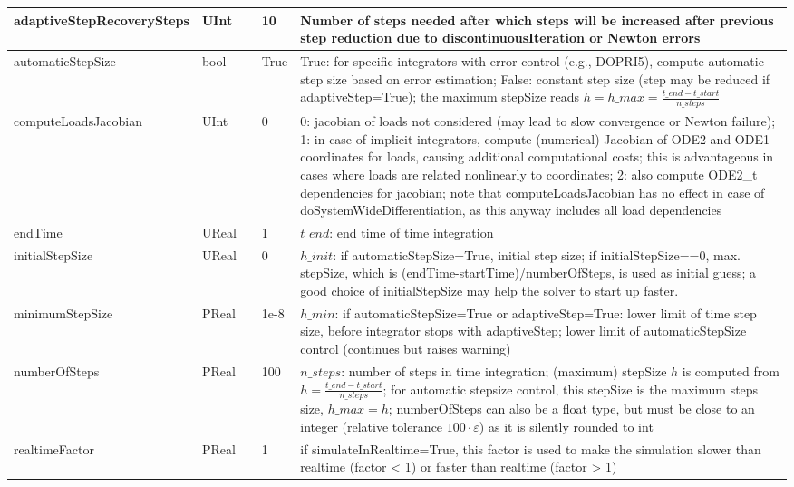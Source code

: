 \begin{center}
\begin{longtable}{| p{4.2cm} | p{2.5cm} | p{0.3cm} | p{3.0cm} | p{6cm} |}
    adaptiveStepRecoverySteps &     UInt &      &     10 &     Number of steps needed after which steps will be increased after previous step reduction due to discontinuousIteration or Newton errors\\ \hline
    automaticStepSize &     bool &      &     True &     True: for specific integrators with error control (e.g., DOPRI5), compute automatic step size based on error estimation; False: constant step size (step may be reduced if adaptiveStep=True); the maximum stepSize reads $h = h\_{max} = \frac{t\_{end} - t\_{start}}{n\_{steps}}$\\ \hline
    computeLoadsJacobian &     UInt &      &     0 &     0:  jacobian of loads not considered (may lead to slow convergence or Newton failure); 1: in case of implicit integrators, compute (numerical) Jacobian of ODE2 and ODE1 coordinates for loads, causing additional computational costs; this is advantageous in cases where loads are related nonlinearly to coordinates; 2: also compute ODE2\_t dependencies for jacobian; note that computeLoadsJacobian has no effect in case of doSystemWideDifferentiation, as this anyway includes all load dependencies\\ \hline
    endTime &     UReal &      &     1 &     $t\_{end}$: end time of time integration\\ \hline
    initialStepSize &     UReal &      &     0 &     $h\_{init}$: if automaticStepSize=True, initial step size; if initialStepSize==0, max. stepSize, which is (endTime-startTime)/numberOfSteps, is used as initial guess; a good choice of initialStepSize may help the solver to start up faster.\\ \hline
    minimumStepSize &     PReal &      &     1e-8 &     $h\_{min}$: if automaticStepSize=True or adaptiveStep=True: lower limit of time step size, before integrator stops with adaptiveStep; lower limit of automaticStepSize control (continues but raises warning)\\ \hline
    numberOfSteps &     PReal &      &     100 &     $n\_{steps}$: number of steps in time integration; (maximum) stepSize $h$ is computed from $h = \frac{t\_{end} - t\_{start}}{n\_{steps}}$; for automatic stepsize control, this stepSize is the maximum steps size, $h\_{max} = h$; numberOfSteps can also be a float type, but must be close to an integer (relative tolerance $100\cdot\varepsilon$) as it is silently rounded to int\\ \hline
    realtimeFactor &     PReal &      &     1 &     if simulateInRealtime=True, this factor is used to make the simulation slower than realtime (factor < 1) or faster than realtime (factor > 1)\\ \hline

\end{longtable}
\end{center}
